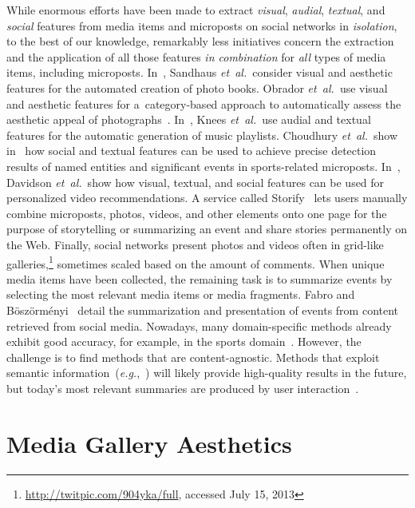 While enormous efforts have been made to extract
\emph{visual}, \emph{audial},
\emph{textual}, and \emph{social} features
from media items and microposts on social networks in \emph{isolation},
to the best of our knowledge, remarkably less initiatives
concern the extraction and the application
of all those features \emph{in combination}
for \emph{all} types of media items, including microposts.
In~\cite{sandhaus2011photobook}, Sandhaus \emph{et~al.}\ consider visual and
aesthetic features for the automated creation of photo books.
Obrador \emph{et~al.}\ use visual and aesthetic features
for a~category-based approach to automatically assess
the aesthetic appeal of photographs~\cite{obrador2012photoaesthetics}.
In~\cite{knees2006musicplaylist}, Knees \emph{et~al.}\ use audial and textual
features for the automatic generation of music playlists.
Choudhury \emph{et~al.}\ show in~\cite{choudhury2011sportstweets} how social and textual
features can be used to achieve precise detection results
of named entities and significant events in sports-related microposts.
In~\cite{davidson2010videorecommendation}, Davidson \emph{et~al.}\ show how visual,
textual, and social features can be used for personalized video recommendations.
A service called Storify~\cite{fincham2011storify} lets users manually combine
microposts, photos, videos, and other elements onto one page for the purpose
of storytelling or summarizing an event
and share stories permanently on the Web.
Finally, social networks present photos and videos
often in grid-like galleries,\footnote{\url{http://twitpic.com/904yka/full}, accessed July 15, 2013}
sometimes scaled based on the amount of comments.
When unique media items have been collected,
the remaining task is to summarize events by selecting the most relevant media items or media fragments.
Fabro and B\"osz\"orm\'enyi~\cite{delfabro2012summarization} detail
the summarization and presentation of events from content retrieved from social media.
Nowadays, many domain-specific methods already exhibit good accuracy,
for example, in the sports domain~\cite{li2001sportsvideo,li2010americanfootball}. However, the challenge is to find methods that are content-agnostic.
Methods that exploit semantic information~(\emph{e.g.},~\cite{chen2009videosummarization})
will likely provide high-quality results in the future,
but today's most relevant summaries are produced by user interaction~\cite{olsen2011videosummarization}.

\section{Media Gallery Aesthetics}

